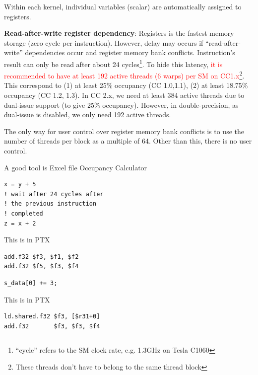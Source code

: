 \begin{framed}
  Within each kernel, individual variables (scalar) are automatically
  assigned to registers. 
\end{framed}


{\bf Read-after-write register dependency}: Registers is the fastest
memory storage (zero cycle per instruction). However, delay may occurs
if ``read-after-write'' dependencies occur and register memory bank
conflicts. Instruction's result can only be read after about 24
cycles\footnote{``cycle'' refers to the SM clock rate, e.g. 1.3GHz on
  Tesla C1060}.
To hide this latency,
\textcolor{red}{it is recommended to have at least 192 active threads
  (6 warps) per SM on
  CC1.x\footnote{These threads don't have to belong to the same thread
    block}}.
This correspond to (1) at least 25\% occupancy (CC 1.0,1.1), (2) at
least 18.75\% occupancy (CC 1.2, 1.3).  In CC 2.x, we need at least
384 active threads due to dual-issue support (to give 25\% occupancy).
However, in double-precision, as dual-issue is disabled, we only need
192 active threads.

The only way for user control over register memory bank conflicts is
to use the number of threads per block as a multiple of 64. Other than
this, there is no user control.

\begin{framed}
  A good tool is Excel file Occupancy Calculator
\end{framed}


\begin{table}[ht]
  \begin{minipage}[b]{0.5\linewidth}
\begin{lstlisting}
x = y + 5
! wait after 24 cycles after 
! the previous instruction
! completed
z = x + 2  
\end{lstlisting}
    This is in PTX
\begin{lstlisting}
add.f32 $f3, $f1, $f2
add.f32 $f5, $f3, $f4
\end{lstlisting}
  \end{minipage}
  \hspace{0.5cm}
  \begin{minipage}[b]{0.5\linewidth}
\begin{lstlisting}
s_data[0] += 3;
\end{lstlisting}
    This is in PTX
\begin{lstlisting}
ld.shared.f32 $f3, [$r31+0]
add.f32       $f3, $f3, $f4
\end{lstlisting}
  \end{minipage}
  \caption{}
\end{table}


